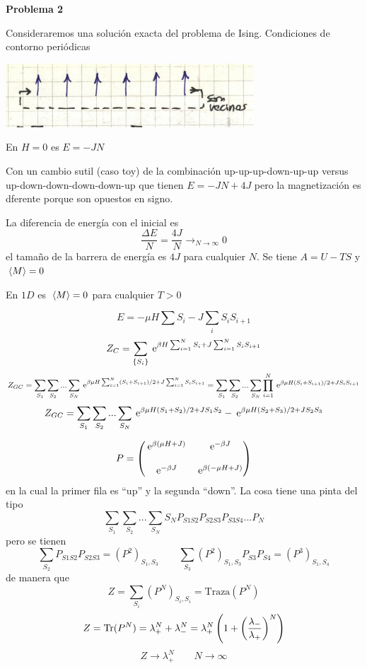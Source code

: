 \documentclass[10pt,oneside]{CBFT_book}
\begin{document}
\begin{ejemplo}{\bf Problema 2}

Consideraremos una solución exacta del problema de Ising.
Condiciones de contorno periódicas

\includegraphics[scale=0.5]{images/1606337141.jpg}

En $H=0$ es $E=-JN$


Con un cambio sutil (caso toy) de la combinación
up-up-up-down-up-up versus up-down-down-down-down-up que tienen $E=-JN+4J$
pero la magnetización es dferente porque son opuestos en signo.

La diferencia de energía con el inicial es
\[
	\frac{\Delta E}{N} = \frac{4J}{N} \to_{N\to \infty} 0
\]
el tamaño de la barrera de energía es $4J$ para cualquier $N$.
Se tiene $A=U-TS$ y $\:\left\langle M \right\rangle=0$
 
En $1D$ es $\:\left\langle M \right\rangle=0$ para cualquier $T>0$

\[
	E = - \mu H \sum S_i - J \sum_i S_i S_{i+1}
\]
\[
	Z_C = \sum_{\{ S_i \}} \:\mathrm{e}^{ \beta H \sum_{i=1}^N S_i + J \sum^N_{i=1} S_i S_{i+1}}
\]
\[
	Z_{GC} = \sum_{S_1} \sum_{S_2} ... \sum_{S_N} \:\mathrm{e}^{ \beta \mu H \sum_{i=1}^N (S_i+S_{i+1})/2 
	+ J \sum^N_{i=1} S_i S_{i+1}} =
	\sum_{S_1} \sum_{S_2} ... \sum_{S_N} \prod_{i=1}^N \:\mathrm{e}^{ \beta \mu H (S_i+S_{i+1})/2 
	+ J S_i S_{i+1}}
\]
\[
	Z_{GC} =
	\sum_{S_1} \sum_{S_2} ... \sum_{S_N} 
	\:\mathrm{e}^{ \beta \mu H (S_1+S_2)/2 + J S_1 S_2} - 
	\:\mathrm{e}^{ \beta \mu H (S_2+S_3)/2 + J S_2 S_3}
\]
 
\[
	P = \begin{pmatrix}
	 \:\mathrm{e}^{\beta(\mu H + J)} & \:\mathrm{e}^{-\beta J} \\
	& \\ 
	 \:\mathrm{e}^{-\beta J} &  \:\mathrm{e}^{\beta(-\mu H + J)}
	\end{pmatrix}
\]
en la cual la primer fila es ``up'' y la segunda ``down''.
La cosa tiene una pinta del tipo
\[
	\sum_{S_1} \sum_{S_2} ... \sum_{S_N} S_N P_{S1 S2} P_{S2 S3} P_{S3 S4} ... P_N
\]
pero se tienen
\[
	\sum_{S_2} P_{S1 S2} P_{S2 S3} = (P^2)_{S_1,S_3} \qquad 
	\sum_{S_3} (P^2)_{S_1,S_3} P_{S3} P_{S4} = (P^3)_{S_1,S_4} 
\]
de manera que 
\[
	Z = \sum_{S_i} (P^N)_{S_i,S_i} = \text{Traza}(P^N)
\]
\[
	Z = \text{Tr}(P^N) = \lambda^N_+ + \lambda^N_- = 
	\lambda^N_+\left( 1 + \left( \frac{ \lambda_- }{ \lambda_+ } \right)^N \right) 
\]
\[
	Z \to \lambda^N_+ \qquad {N\to\infty}
\]


\end{ejemplo}
\end{document}
